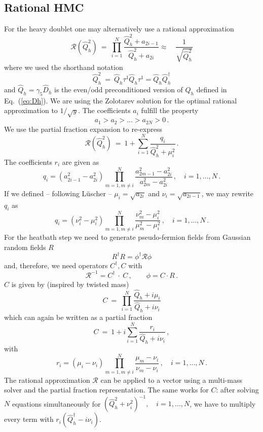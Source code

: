 \subsection{Rational HMC}

For the heavy doublet one may alternatively use a rational
approximation 
\[
\mathcal{R}(\hat Q_h^2)\ = \ \prod_{i = 1}^N \frac{\hat Q_h^2 +
  a_{2i-1}}{\hat Q_h^2 + a_{2i}}\approx\quad\frac{1}{\sqrt{\hat Q_h^2}}
\]
where we used the shorthand notation
\[
\hat Q_h^2\ =\ \hat Q_h \tau^1\hat Q_h \tau^1 = \hat Q_h \hat Q_h^\dagger
\]
and $\hat Q_h=\gamma_5\hat D_h$ is the even/odd preconditioned version
of $Q_h$ defined
in Eq.~(\ref{eq:Dh}). We are using the Zolotarev solution for the
optimal rational approximation to $1/\sqrt{y}$. The coefficients $a_i$
fulfill the property
\[
a_1 > a_2 > ... > a_{2N} > 0\, .
\]
We use the partial fraction expansion to re-express
\[
\mathcal{R}(\hat Q_h^2)\ = \ 1 + \sum_{i=1}^{N} \frac{q_i}{\hat Q_h^2 +
  \mu_i^2}\, .
\]
The coefficients $r_i$ are given as
\[
q_i = (a_{2i-1}^2 - a_{2i}^2) \prod_{m=1, m\neq i}^N \frac{a_{2m-1}^2
  - a_{2i}^2}{a_{2m}^2 - a_{2i}^2}\,,\quad i = 1,...,N\,.
\]
If we defined -- following L{\"u}scher -- $\mu_i = \sqrt{a_{2i}}$ and $\nu_i
= \sqrt{a_{2i-1}}$, we may rewrite $q_i$ as
\[
q_i = (\nu_i^2 - \mu_i^2)\prod_{m=1, m\neq i}^N \frac{\nu_m^2 -
  \mu_i^2}{\mu_m^2 - \mu_i^2}\,,\quad i = 1,...,N\, .
\]
For the heatbath step we need to generate pseudo-fermion fields from
Gaussian random fields $R$
\[
R^\dagger R = \phi^\dagger \mathcal{R} \phi
\]
and, therefore, we need operators $C^\dagger, C$ with
\[
\mathcal{R}^{-1} = C^\dagger\ \cdot\ C\,,\qquad \phi = C\cdot R\,.
\]
$C$ is given by (inspired by twisted mass)
\[
C\ =\ \prod_{i=1}^N \frac{\hat Q_h + i\mu_i}{\hat Q_h + i\nu_i}
\]
which can again be written as a partial fraction
\[
C\ =\ 1 + i\sum_{i=1}^N \frac{r_i}{\hat Q_h + i\nu_i}\,,
\]
with
\[
r_i = (\mu_i - \nu_i)\prod_{m=1, m\neq i}^N \frac{\mu_m -
  \nu_i}{\nu_m - \nu_i}\,,\quad i = 1,...,N\, .
\]
The rational approximation $\mathcal{R}$ can be applied to a vector
using a multi-mass solver and the partial fraction representation. The
same works for $C$: after solving $N$ equations simultaneously for
$(\hat Q_h^2 + \nu_i^2)^{-1},\quad i = 1,...,N$, we have to multiply
every term with $r_i(\hat Q_h^\dagger - i\nu_i)$.
